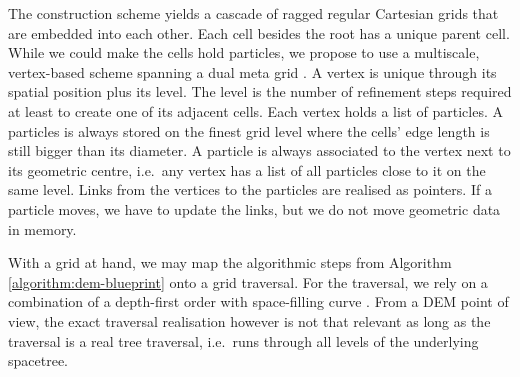 \documentclass[times,12pt]{article}
\begin{document}
The construction scheme yields a cascade of ragged regular Cartesian grids that
are embedded into each other.
Each cell besides the root has a unique parent cell.
While we could make the cells hold particles, we propose to use a
multiscale, vertex-based scheme spanning a dual meta grid
\cite{Weinzierl:16:PIC}.
A vertex is unique through its spatial position plus its level. 
The level is the number of refinement steps required at least to create one of
its adjacent cells.
Each vertex holds a list of particles.
A particles is always stored on the finest grid level where the cells' edge
length is still bigger than its diameter.
A particle is always associated to the vertex next to its geometric centre,
i.e.~any vertex has a list of all particles close to it on the same level.
Links from the vertices to the particles are realised as pointers. 
If a particle moves, we have to update the links, but we do not move
geometric data in memory.

With a grid at hand, we may map the algorithmic steps from Algorithm
\ref{algorithm:dem-blueprint} onto a grid traversal.
For the traversal, we rely on a combination of a depth-first order with
space-filling curve \cite{Weinzierl:2009:Diss,Weinzierl:11:Peano}.
From a DEM point of view, the exact traversal realisation however is not that
relevant as long as the traversal is a real tree traversal, i.e.~runs through
all levels of the underlying spacetree.
\end{document}
